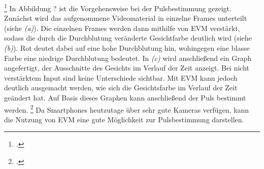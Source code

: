 {\begin{figure}[h]
\end{figure}\footcitetext{MIT15} \newline
In Abbildung ? ist die Vorgehensweise bei der Pulsbestimmung gezeigt. Zunächst wird das aufgenommene Videomaterial in einzelne Frames unterteilt (siehe \textit{(a)}). Die einzelnen Frames werden dann mithilfe von EVM verstärkt, sodass die durch die Durchblutung veränderte Gesichtfarbe deutlich wird (siehe \textit{(b)}). Rot deutet dabei auf eine hohe Durchblutung hin, wohingegen eine blasse Farbe eine niedrige Durchblutung bedeutet. In \textit{(c)} wird anschließend ein Graph angefertigt, der Ausschnitte des Gesichts im Verlauf der Zeit anzeigt. Bei nicht verstärktem Input sind keine Unterschiede sichtbar. Mit EVM kann jedoch deutlich ausgemacht werden, wie sich die Gesichtsfarbe im Verlauf der Zeit geändert hat. Auf Basis dieses Graphen kann anschließend der Puls bestimmt werden. \footcite[Vgl.][]{MIT15} \newline
Da Smartphones heutzutage über sehr gute Kameras verfügen, kann die Nutzung von EVM eine gute Möglichkeit zur Pulsbestimmung darstellen.
}
